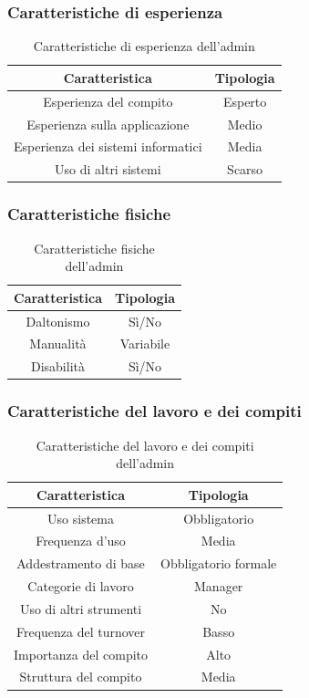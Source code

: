 \clearpage
\subsubsection{Caratteristiche di esperienza}
\begin{table}[h]
	\centering
	\begin{tabular}{|c|c|}
		\hline
		\textbf{Caratteristica} & \textbf{Tipologia} \\
		\hline
		Esperienza del compito & Esperto \\
		\hline
		Esperienza sulla applicazione & Medio \\
		\hline
		Esperienza dei sistemi informatici & Media \\
		\hline
		Uso di altri sistemi & Scarso \\
		\hline
	\end{tabular}
	\caption{Caratteristiche di esperienza dell'admin}
\end{table}

\subsubsection{Caratteristiche fisiche}
\begin{table}[h]
	\centering
	\begin{tabular}{|c|c|}
		\hline
		\textbf{Caratteristica} & \textbf{Tipologia} \\
		\hline
		Daltonismo & Sì/No \\
		\hline
		Manualità & Variabile \\
		\hline
		Disabilità & Sì/No\\
		\hline
	\end{tabular}
	\caption{Caratteristiche fisiche dell'admin}
\end{table}

\subsubsection{Caratteristiche del lavoro e dei compiti}
\begin{table}[h]
	\centering
	\begin{tabular}{|c|c|}
		\hline
		\textbf{Caratteristica} & \textbf{Tipologia} \\
		\hline
		Uso sistema & Obbligatorio \\
		\hline
		Frequenza d'uso & Media \\
		\hline
		Addestramento di base & Obbligatorio formale \\
		\hline
		Categorie di lavoro & Manager \\
		\hline
		Uso di altri strumenti & No \\
		\hline
		Frequenza del turnover & Basso \\
		\hline
		Importanza del compito & Alto \\
		\hline
		Struttura del compito & Media \\
		\hline
	\end{tabular}
	\caption{Caratteristiche del lavoro e dei compiti dell'admin}
\end{table}

